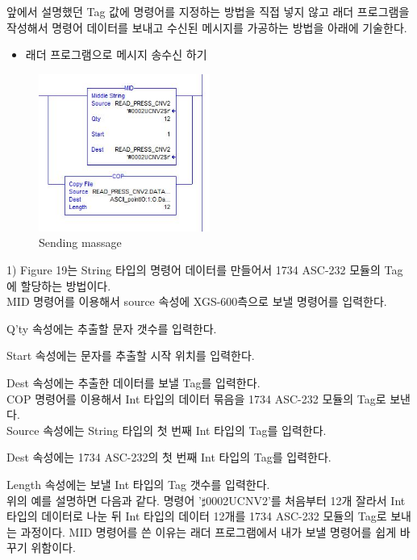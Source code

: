 \documentclass[11pt
  , a4paper
  , article
  , oneside
]{memoir}
\begin{document}
앞에서 설명했던 Tag 값에 명령어를 지정하는 방법을 직접 넣지 않고 래더 프로그램을 작성해서 명령어 데이터를 보내고 수신된 메시지를 가공하는 방법을 아래에 기술한다.
 
\begin{itemize}
	\item 래더 프로그램으로 메시지 송수신 하기
\end{itemize} 

\begin{figure}[h]
	\centering
	\includegraphics[width=0.5\textwidth]{./picture/ladder_com.JPG}
	\caption{Sending massage}
	\label{fig:}
\end{figure}

1) Figure 19는 String 타입의 명령어 데이터를 만들어서 1734 ASC-232 모듈의 Tag에 할당하는 방법이다.\\

MID 명령어를 이용해서 source 속성에 XGS-600측으로 보낼 명령어를 입력한다.\

Q'ty 속성에는 추출할 문자 갯수를 입력한다.\

Start 속성에는 문자를 추출할 시작 위치를 입력한다.\

Dest 속성에는 추출한 데이터를 보낼 Tag를 입력한다.\\


COP 명령어를 이용해서 Int 타입의 데이터 묶음을 1734 ASC-232 모듈의 Tag로 보낸다.\\

Source 속성에는 String 타입의 첫 번째 Int 타입의 Tag를 입력한다.\

Dest 속성에는 1734 ASC-232의 첫 번째 Int 타입의 Tag를 입력한다.\

Length 속성에는 보낼 Int 타입의 Tag 갯수를 입력한다.\\

위의 예를 설명하면 다음과 같다. 명령어 '$\sharp$0002UCNV2'를 처음부터 12개 잘라서 Int 타입의 데이터로 나눈 뒤 Int 타입의 데이터 12개를 1734 ASC-232 모듈의 Tag로 보내는 과정이다. MID 명령어를 쓴 이유는 래더 프로그램에서 내가 보낼 명령어를 쉽게 바꾸기 위함이다.\\
\end{document}
